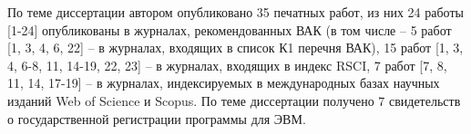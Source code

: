 По теме диссертации автором опубликовано 35 печатных работ, из них 24 работы [1-24] опубликованы в журналах, рекомендованных ВАК (в том числе -- 5 работ [1, 3, 4, 6, 22] -- в журналах, входящих в список К1 перечня ВАК), 15 работ [1, 3, 4, 6-8, 11, 14-19, 22, 23] -- в журналах, входящих в индекс RSCI, 7 работ [7, 8, 11, 14, 17-19] -- в журналах, индексируемых в международных базах научных изданий Web of Science и Scopus.
По теме диссертации получено 7 свидетельств о государственной регистрации программы для ЭВМ.